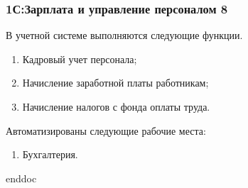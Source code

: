 %
\subsubsection{1С:Зарплата и управление персоналом 8}
В учетной системе выполняются следующие функции.
\begin{enumerate}
\item Кадровый учет персонала;
\item Начисление заработной платы работникам;
\item Начисление налогов с фонда оплаты труда.
\end{enumerate}

Автоматизированы следующие рабочие места:
\begin{enumerate}
\item Бухгалтерия.
\end{enumerate}


 {enddoc} 